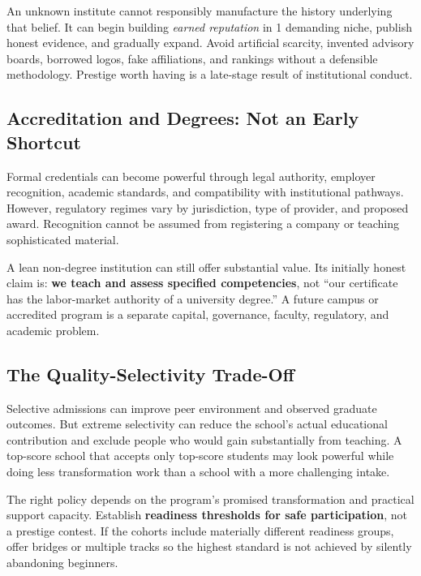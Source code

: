 An unknown institute cannot responsibly manufacture the history underlying that belief. It can begin building \textit{earned reputation} in 1 demanding niche, publish honest evidence, and gradually expand. Avoid artificial scarcity, invented advisory boards, borrowed logos, fake affiliations, and rankings without a defensible methodology. Prestige worth having is a late-stage result of institutional conduct.

\subsection{Accreditation and Degrees: Not an Early Shortcut}
\label{sec:accreditation_not_early_shortcut}

Formal credentials can become powerful through legal authority, employer recognition, academic standards, and compatibility with institutional pathways. However, regulatory regimes vary by jurisdiction, type of provider, and proposed award. Recognition cannot be assumed from registering a company or teaching sophisticated material.

A lean non-degree institution can still offer substantial value. Its initially honest claim is: \textbf{we teach and assess specified competencies}, not ``our certificate has the labor-market authority of a university degree.'' A future campus or accredited program is a separate capital, governance, faculty, regulatory, and academic problem.

\subsection{The Quality-Selectivity Trade-Off}
\label{sec:quality_selectivity_tradeoff}

Selective admissions can improve peer environment and observed graduate outcomes. But extreme selectivity can reduce the school's actual educational contribution and exclude people who would gain substantially from teaching. A top-score school that accepts only top-score students may look powerful while doing less transformation work than a school with a more challenging intake.

The right policy depends on the program's promised transformation and practical support capacity. Establish \textbf{readiness thresholds for safe participation}, not a prestige contest. If the cohorts include materially different readiness groups, offer bridges or multiple tracks so the highest standard is not achieved by silently abandoning beginners.

